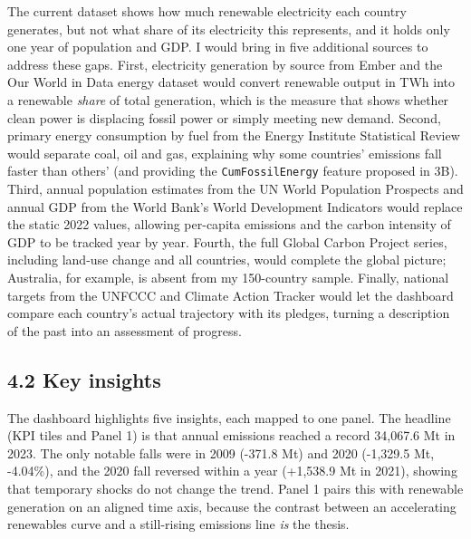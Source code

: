 \documentclass[
]{article}
\begin{document}
The current dataset shows how much renewable electricity each country
generates, but not what share of its electricity this represents, and it
holds only one year of population and GDP. I would bring in five
additional sources to address these gaps. First, electricity generation
by source from Ember and the Our World in Data energy dataset would
convert renewable output in TWh into a renewable \emph{share} of total
generation, which is the measure that shows whether clean power is
displacing fossil power or simply meeting new demand. Second, primary
energy consumption by fuel from the Energy Institute Statistical Review
would separate coal, oil and gas, explaining why some countries'
emissions fall faster than others' (and providing the
\texttt{CumFossilEnergy} feature proposed in 3B). Third, annual
population estimates from the UN World Population Prospects and annual
GDP from the World Bank's World Development Indicators would replace the
static 2022 values, allowing per-capita emissions and the carbon
intensity of GDP to be tracked year by year. Fourth, the full Global
Carbon Project series, including land-use change and all countries,
would complete the global picture; Australia, for example, is absent
from my 150-country sample. Finally, national targets from the UNFCCC
and Climate Action Tracker would let the dashboard compare each
country's actual trajectory with its pledges, turning a description of
the past into an assessment of progress.

\subsection{4.2 Key insights}\label{key-insights}

The dashboard highlights five insights, each mapped to one panel. The
headline (KPI tiles and Panel 1) is that annual emissions reached a
record 34,067.6 Mt in 2023. The only notable falls were in 2009 (-371.8
Mt) and 2020 (-1,329.5 Mt, -4.04\%), and the 2020 fall reversed within a
year (+1,538.9 Mt in 2021), showing that temporary shocks do not change
the trend. Panel 1 pairs this with renewable generation on an aligned
time axis, because the contrast between an accelerating renewables curve
and a still-rising emissions line \emph{is} the thesis.
\end{document}
